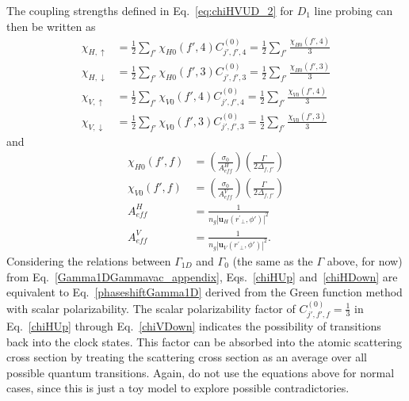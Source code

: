 The coupling strengths defined in Eq.~\eqref{eq:chiHVUD_2} for $ D_1 $ line probing can then be written as
\begin{align}
\chi_{H,\uparrow} &=   \frac{1}{2} \sum_{f'} \chi_{H0}(f',4) C_{j',f',4}^{(0)}  =  \frac{1}{2} \sum_{f'} \frac{\chi_{H0}(f',4)}{3} \label{chiHUp}  \\
\chi_{H,\downarrow} &=   \frac{1}{2} \sum_{f'} \chi_{H0}(f',3)  C_{j',f',3}^{(0)} = \frac{1}{2} \sum_{f'} \frac{\chi_{H0}(f',3) }{3} \label{chiHDown}\\
\chi_{V,\uparrow} &=   \frac{1}{2} \sum_{f'} \chi_{V0}(f',4)  C_{j',f',4}^{(0)}  =   \frac{1}{2} \sum_{f'} \frac{\chi_{V0}(f',4)}{3}\label{chiVUp}  \\
\chi_{V,\downarrow} &=   \frac{1}{2} \sum_{f'} \chi_{V0}(f',3)  C_{j',f',3}^{(0)}=   \frac{1}{2} \sum_{f'} \frac{\chi_{V0}(f',3) }{3} \label{chiVDown}
\end{align}
and 
\begin{align}
\chi_{H0}(f',f) &= \left( \frac{ \sigma_0}{A_{ef\!f}^H} \right) \left( \frac{\Gamma}{2 \Delta_{f,f'}} \right)\\
\chi_{V0}(f',f) &= \left( \frac{ \sigma_0}{A_{ef\!f}^V} \right) \left( \frac{\Gamma}{2 \Delta_{f,f'}} \right)\\
A_{ef\!f}^H &= \frac{1}{n_g|\mathbf{u}_{H}(r^\prime\!\!_\perp,\phi')|^2}\\
A_{ef\!f}^V &= \frac{1}{n_g | \mathbf{u}_{V}(r^\prime\!\!_\perp,\phi')|^2}.\label{eq:AeffV}
\end{align}
Considering the relations between $ \Gamma_{1D} $ and $ \Gamma_0 $ (the same as the $ \Gamma $ above, for now) from Eq.~\eqref{Gamma1DGammavac_appendix}, Eqs.~\eqref{chiHUp} and~\eqref{chiHDown} are equivalent to Eq.~\eqref{phaseshiftGamma1D} derived from the Green function method with scalar polarizability. The scalar polarizability factor of $ C_{j',f',f}^{(0)}=\frac{1}{3} $ in Eq.~\eqref{chiHUp} through Eq.~\eqref{chiVDown} indicates the possibility of transitions back into the clock states. This factor can be absorbed into the atomic scattering cross section by treating the scattering cross section as an average over all possible quantum transitions. 
Again, do not use the equations above for normal cases, since this is just a toy model to explore possible contradictories.


